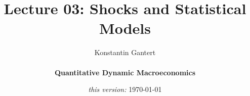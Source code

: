 \documentclass[10pt,c,aspectratio=1610,handout]{beamer}
\begin{document}
\title{Lecture 03: Shocks and Statistical Models}
\author[Konstantin Gantert]{\begin{large} Konstantin Gantert \end{large} \\ \textbf{Quantitative Dynamic Macroeconomics}}
\date{\textit{this version:} \today}

\beamertemplatenavigationsymbolsempty

{ 
\frame{\titlepage}}
 \addtocounter{framenumber}{-1}
\end{document}
